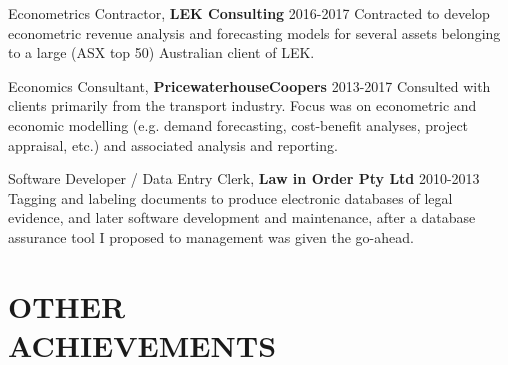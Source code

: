 \documentclass[margin]{res}
\begin{document}
\begin{resume}
		{Econometrics Contractor,} {\bf LEK Consulting} \hfill 2016-2017\vspace{1mm}\newline
		Contracted to develop econometric revenue analysis and forecasting models for several assets belonging to a large (ASX top 50) Australian client of LEK.
		
		{Economics Consultant,} {\bf PricewaterhouseCoopers} \hfill 2013-2017\vspace{1mm}\newline
		Consulted with clients primarily from the transport industry. Focus was on econometric and economic modelling (e.g. demand forecasting, cost-benefit analyses, project appraisal, etc.) and associated analysis and reporting.
		
		{Software Developer / Data Entry Clerk,} {\bf Law in Order Pty Ltd} \hfill 2010-2013\vspace{1mm}\newline
		Tagging and labeling documents to produce electronic databases of legal evidence, and later software development and maintenance, after a database assurance tool I proposed to management was given the go-ahead.
		
		
		\section{OTHER \\ ACHIEVEMENTS}
		

\end{resume}
\end{document}
